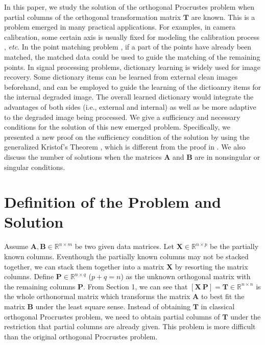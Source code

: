 \documentclass[titlepage,11pt,twoside]{article}
\begin{document}
In this paper, we study the solution of the orthogonal Procrustes problem when partial columns of the orthogonal transformation matrix $\mathbf{T}$ are known. This is a problem emerged in many practical applications. For examples, in camera calibration, some certain axis is usually fixed for modeling the calibration process \cite{zhang2000flexible}, \emph{etc}. In the point matching problem \cite{pointpatterns}, if a part of the points have already been matched, the matched data could be used to guide the matching of the remaining points. In signal processing problems, dictionary learning \cite{aharon2006img} is widely used for image recovery. Some dictionary items can be learned from external clean images beforehand, and can be employed to guide the learning of the dictioanry items for the internal degraded image. The overall learned dictionary would integrate the advantages of both sides (i.e., external and internal) as well as be more adaptive to the degraded image being processed. We give a sufficiency and necessary conditions for the solution of this new emerged problem. Specifically, we presented a new proof on the sufficiency condition of the solution by using the generalized Kristof's Theorem \cite{TenBerge1983}, which is different from the proof in \cite{schonemann1966generalized}. We also discuss the number of solutions when the matrices $\mathbf{A}$ and $\mathbf{B}$ are in nonsingular or singular conditions.

\section{Definition of the Problem and Solution}
Assume $\mathbf{A},\mathbf{B}\in \mathbb{R}^{n\times m}$ be two given data matrices. Let $\mathbf{X}\in\mathbb{R}^{n\times p}$ be the partially known columns. Eventhough the partially known columns may not be stacked together, we can stack them together into a matrix $\mathbf{X}$ by resorting the matrix columns. Define $\mathbf{P}\in\mathbb{R}^{n\times q}$ ($p+q=n$) as the unknown orthogonal matrix with the remaining columns $\mathbf{P}$. From Section 1, we can see that $[\mathbf{X}\ \mathbf{P}]=\mathbf{T}\in\mathbb{R}^{n\times n}$ is the whole orthonormal matrix which transforms the matrix $\mathbf{A}$ to best fit the matrix $\mathbf{B}$ under the least square sense. Instead of obtaining $\mathbf{T}$ in classical orthogonal Procrustes problem, we need to obtain partial columns of $\mathbf{T}$ under the restriction that partial columns are already given. This problem is more difficult than the original orthogonal Procrustes problem. 
\end{document}
